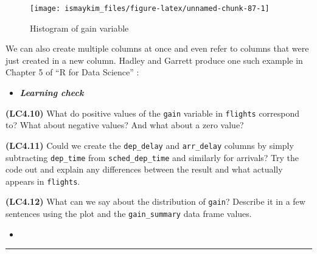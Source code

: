 \documentclass[12pt, krantz2,]{krantz}
\makeatletter
\newenvironment{Shaded}{\begin{snugshade}}{\end{snugshade}}
\newcommand{\DataTypeTok}[1]{\textcolor[rgb]{0.27,0.27,0.27}{#1}}
\newcommand{\DecValTok}[1]{\textcolor[rgb]{0.06,0.06,0.06}{#1}}
\newcommand{\KeywordTok}[1]{\textcolor[rgb]{0.27,0.27,0.27}{\textbf{#1}}}
\newcommand{\NormalTok}[1]{#1}
\newcommand{\OperatorTok}[1]{\textcolor[rgb]{0.43,0.43,0.43}{\textbf{#1}}}
\newcommand{\StringTok}[1]{\textcolor[rgb]{0.5,0.5,0.5}{#1}}
\newenvironment{kframe}{%
\medskip{}
\setlength{\fboxsep}{.8em}
 \def\at@end@of@kframe{}%
 \ifinner\ifhmode%
  \def\at@end@of@kframe{\end{minipage}}%
  \begin{minipage}{\columnwidth}%
 \fi\fi%
 \def\FrameCommand##1{\hskip\@totalleftmargin \hskip-\fboxsep
 \colorbox{shadecolor}{##1}\hskip-\fboxsep
     \hskip-\linewidth \hskip-\@totalleftmargin \hskip\columnwidth}%
 \MakeFramed {\advance\hsize-\width
   \@totalleftmargin\z@ \linewidth\hsize
   \@setminipage}}%
 {\par\unskip\endMakeFramed%
 \at@end@of@kframe}
\renewenvironment{Shaded}{\begin{kframe}}{\end{kframe}}
\newenvironment{rmdblock}[1]
  {\begin{shaded*}
  \begin{itemize}
  \renewcommand{\labelitemi}{
    \raisebox{-.7\height}[0pt][0pt]{
    }
  }
  \item
  }
  {
  \end{itemize}
  \end{shaded*}
  }
\newenvironment{learncheck}
  {\begin{rmdblock}{warning}}
  {\end{rmdblock}}
\makeatother
\begin{document}
\begin{figure}

{\centering \texttt{[image: ismaykim\_files/figure-latex/unnamed-chunk-87-1]} 

}

\caption{Histogram of gain variable}\label{fig:unnamed-chunk-87}
\end{figure}

We can also create multiple columns at once and even refer to columns that were just created in a new column. Hadley and Garrett produce one such example in Chapter 5 of ``R for Data Science'' \citep{rds2016}:

\begin{Shaded}
\end{Shaded}

\begin{learncheck}
\textbf{\emph{Learning check}}
\end{learncheck}

\textbf{(LC4.10)} What do positive values of the \texttt{gain} variable in \texttt{flights} correspond to? What about negative values? And what about a zero value?

\textbf{(LC4.11)} Could we create the \texttt{dep\_delay} and \texttt{arr\_delay} columns by simply subtracting \texttt{dep\_time} from \texttt{sched\_dep\_time} and similarly for arrivals? Try the code out and explain any differences between the result and what actually appears in \texttt{flights}.

\textbf{(LC4.12)} What can we say about the distribution of \texttt{gain}? Describe it in a few sentences using the plot and the \texttt{gain\_summary} data frame values.

\begin{learncheck}

\end{learncheck}

\begin{center}\rule{0.5\linewidth}{\linethickness}\end{center}
\end{document}
